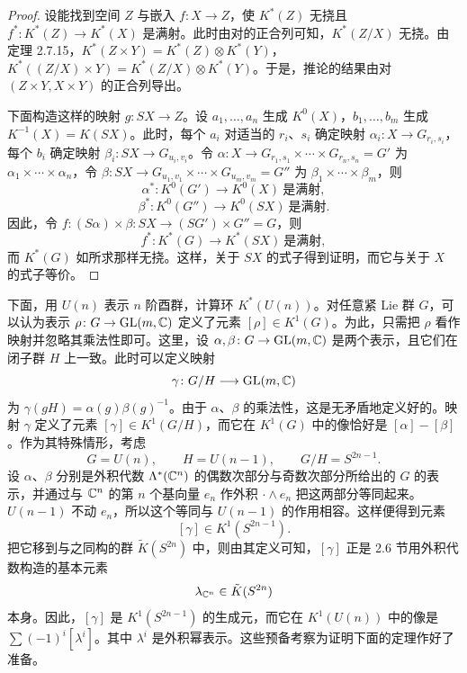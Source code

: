 \begin{proof}
  设能找到空间 $Z$ 与嵌入 $f\colon X\to Z$，使 $K^*(Z)$ 无挠且 $f^*\colon K^*(Z)\to K^*(X)$ 是满射。此时由对的正合列可知，$K^*(Z/X)$ 无挠。由定理 2.7.15，$K^*(Z\times Y)=K^*(Z)\otimes K^*(Y)$，$K^*((Z/X)\times Y)=K^*(Z/X)\otimes K^*(Y)$。于是，推论的结果由对 $(Z\times Y,X\times Y)$ 的正合列导出。

  下面构造这样的映射 $g\colon SX\to Z$。设 $a_1,\ldots,a_n$ 生成 $K^0(X)$，$b_1,\ldots,b_m$ 生成 $K^{-1}(X)=K(SX)$。此时，每个 $a_i$ 对适当的 $r_i$、$s_i$ 确定映射 $\alpha_i\colon X\to G_{r_i,s_i}$，每个 $b_i$ 确定映射 $\beta_i\colon SX\to G_{u_i,v_i}$。令 $\alpha\colon X\to G_{r_1,s_1}\times\cdots\times G_{r_n,s_n}=G'$ 为 $\alpha_1\times\cdots\times\alpha_n$，令 $\beta\colon SX\to G_{u_1,v_1}\times\cdots\times G_{u_m,v_m}=G''$ 为 $\beta_1\times\cdots\times\beta_m$，则
  \[
  \alpha^*\colon K^0(G')\longrightarrow K^0(X)\ \text{是满射},
  \]
  \[
  \beta^*\colon K^0(G'')\longrightarrow K^0(SX)\ \text{是满射}.
  \]
  因此，令 $f\colon(S\alpha)\times\beta\colon SX\to(SG')\times G''=G$，则
  \[
  f^*\colon K^*(G)\longrightarrow K^*(SX)\ \text{是满射},
  \]
  而 $K^*(G)$ 如所求那样无挠。这样，关于 $SX$ 的式子得到证明，而它与关于 $X$ 的式子等价。
\end{proof}


下面，用 $U(n)$ 表示 $n$ 阶酉群，计算环 $K^*(U(n))$。对任意紧 Lie 群 $G$，可以认为表示 $\rho\colon G\to\mathrm{GL}(m,\mathbb{C})$ 定义了元素 $[\rho]\in K^1(G)$。为此，只需把 $\rho$ 看作映射并忽略其乘法性即可。这里，设 $\alpha,\beta\colon G\to\mathrm{GL}(m,\mathbb{C})$ 是两个表示，且它们在闭子群 $H$ 上一致。此时可以定义映射
\[
\gamma\colon G/H\longrightarrow\mathrm{GL}(m,\mathbb{C})
\]
为 $\gamma(gH)=\alpha(g)\beta(g)^{-1}$。由于 $\alpha$、$\beta$ 的乘法性，这是无矛盾地定义好的。映射 $\gamma$ 定义了元素 $[\gamma]\in K^1(G/H)$，而它在 $K^1(G)$ 中的像恰好是 $[\alpha]-[\beta]$。作为其特殊情形，考虑
\[
G=U(n),\qquad H=U(n-1),\qquad G/H=S^{2n-1}.
\]
设 $\alpha$、$\beta$ 分别是外积代数 $\Lambda^*(\mathbb{C}^n)$ 的偶数次部分与奇数次部分所给出的 $G$ 的表示，并通过与 $\mathbb{C}^n$ 的第 $n$ 个基向量 $e_n$ 作外积 $\cdot\wedge e_n$ 把这两部分等同起来。$U(n-1)$ 不动 $e_n$，所以这个等同与 $U(n-1)$ 的作用相容。这样便得到元素
\[
[\gamma]\in K^1(S^{2n-1}).
\]
把它移到与之同构的群 $\tilde K(S^{2n})$ 中，则由其定义可知，$[\gamma]$ 正是 2.6 节用外积代数构造的基本元素
\[
\lambda_{\mathbb{C}^n}\in\tilde K(S^{2n})
\]
本身。因此，$[\gamma]$ 是 $K^1(S^{2n-1})$ 的生成元，而它在 $K^1(U(n))$ 中的像是 $\sum(-1)^i[\lambda^i]$。其中 $\lambda^i$ 是外积幂表示。这些预备考察为证明下面的定理作好了准备。

